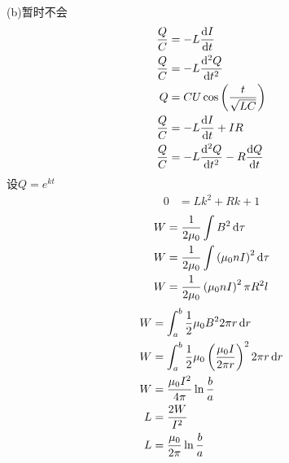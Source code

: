 (b)暂时不会
\begin{align*}
    \frac{Q}{C}&=-L\frac{\dif I}{\dif t}\\
    \frac{Q}{C}&=-L\frac{\dif^2 Q}{\dif t^2}\\
    Q&=CU\cos\left(\frac{t}{\sqrt{LC}}\right)\\
    \frac{Q}{C}&=-L\frac{\dif I}{\dif t}+IR\\
    \frac{Q}{C}&=-L\frac{\dif^2 Q}{\dif t^2}-R\frac{\dif Q}{\dif t}
\end{align*}
设$Q=e^{kt}$
\begin{align*}
    0&=Lk^2+Rk+1
\end{align*}
\begin{align*}
    W&=\frac{1}{2\mu_0}\int B^2\dif \tau\\
    W&=\frac{1}{2\mu_0}\int \left(\mu_0nI\right)^2\dif \tau\\
    W&=\frac{1}{2\mu_0}\left(\mu_0nI\right)^2\pi R^2l\\
\end{align*}
\begin{align*}
    W&=\int_{a}^{b}\frac{1}{2}\mu_0 B^22\pi r\dif r\\
    W&=\int_{a}^{b}\frac{1}{2}\mu_0 \left(\frac{\mu_0I}{2\pi r}\right)^22\pi r\dif r\\
    W&=\frac{\mu_0I^2}{4\pi }\ln\frac{b}{a}\\
    L&=\frac{2W}{I^2}\\
    L&=\frac{\mu_0}{2\pi}\ln\frac{b}{a}
\end{align*}
